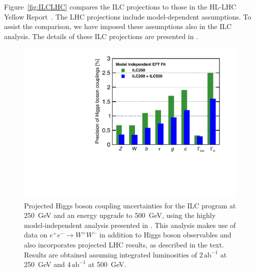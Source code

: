 \documentclass[%
 reprint,
 amsmath,amssymb,
 aps,
]{revtex4-1}
\def\ee{e^+e^-}
\begin{document}
Figure~\ref{fig:ILCLHC} compares the ILC projections to those in the
HL-LHC Yellow Report~\cite{Yellow}.   The LHC projections include
model-dependent assumptions.  To assist the comparison, we have imposed
these assumptions also in the ILC analysis.   The details of these  ILC
projections are presented in \cite{ILCforESS}. 

\begin{figure}
\begin{center}
\includegraphics[width=0.70\hsize]{figures/ModelindepSummary.pdf}
\caption{Projected Higgs boson coupling uncertainties for the ILC
  program at 250~GeV and an energy upgrade to 500~GeV, using the
  highly model-independent analysis presented in \cite{Barklow:2017suo}. This  analysis makes use of  data on $\ee\to W^+W^-$ in addition to Higgs  boson observables and also incorporates projected LHC results, as described  in the text. Results are obtained assuming integrated luminosities of $2\,{\mathrm{ab}}^{-1}$ at 250~GeV and $4\,{\mathrm{ab}}^{-1}$ at 500~GeV.}
\label{fig:ILCmodelindep}
\end{center}
\end{figure}
\end{document}
